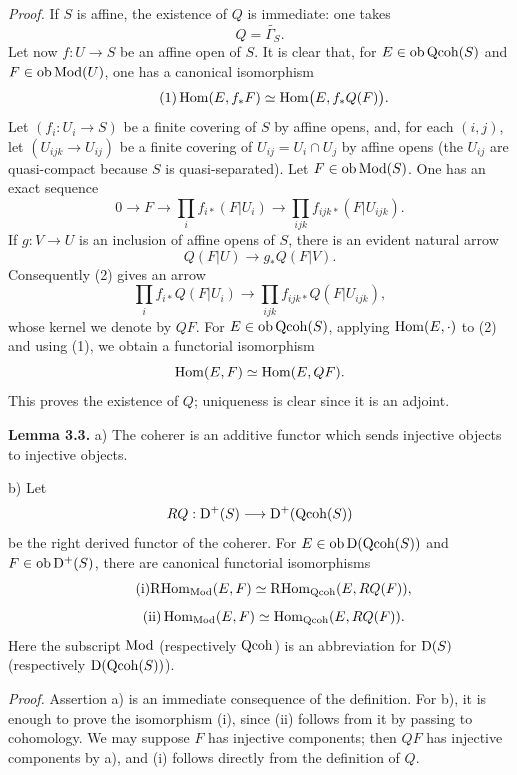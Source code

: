 \documentclass[11pt]{article}
\begin{document}
\emph{Proof.} If $S$ is affine, the existence of $Q$ is immediate: one takes
\[
Q=\widetilde{\Gamma_S}.
\]
Let now $f:U\to S$ be an affine open of $S$. It is clear that, for $E\in\operatorname{ob}\operatorname{Qcoh}(S)$ and $F\in\operatorname{ob}\operatorname{Mod}(U)$, one has a canonical isomorphism
\begin{equation}\tag{1}
\operatorname{Hom}(E,f_*F)\simeq \operatorname{Hom}\bigl(E,f_*Q(F)\bigr).
\end{equation}
Let $(f_i:U_i\to S)$ be a finite covering of $S$ by affine opens, and, for each $(i,j)$, let $(U_{ijk}\to U_{ij})$ be a finite covering of $U_{ij}=U_i\cap U_j$ by affine opens (the $U_{ij}$ are quasi-compact because $S$ is quasi-separated). Let $F\in\operatorname{ob}\operatorname{Mod}(S)$. One has an exact sequence
\begin{equation}\tag{2}
0\longrightarrow F\longrightarrow \prod_i f_{i*}(F|U_i)
\longrightarrow \prod_{ijk} f_{ijk*}(F|U_{ijk}).
\end{equation}
If $g:V\to U$ is an inclusion of affine opens of $S$, there is an evident natural arrow
\[
Q(F|U)\longrightarrow g_*Q(F|V).
\]
Consequently (2) gives an arrow
\begin{equation}\tag{3}
\prod_i f_{i*}Q(F|U_i)
\longrightarrow \prod_{ijk} f_{ijk*}Q(F|U_{ijk}),
\end{equation}
whose kernel we denote by $QF$. For $E\in\operatorname{ob}\operatorname{Qcoh}(S)$, applying $\operatorname{Hom}(E,\cdot)$ to (2) and using (1), we obtain a functorial isomorphism
\[
\operatorname{Hom}(E,F)\simeq \operatorname{Hom}(E,QF).
\]
This proves the existence of $Q$; uniqueness is clear since it is an adjoint.

\textbf{Lemma 3.3.} a) The coherer is an additive functor which sends injective objects to injective objects.

b) Let
\[
RQ:\mathrm D^+(S)\longrightarrow\mathrm D^+(\operatorname{Qcoh}(S))
\]
be the right derived functor of the coherer. For $E\in\operatorname{ob}\mathrm D(\operatorname{Qcoh}(S))$ and $F\in\operatorname{ob}\mathrm D^+(S)$, there are canonical functorial isomorphisms
\begin{equation}\tag{i}
\mathrm R\!\operatorname{Hom}_{\operatorname{Mod}}(E,F)\simeq \mathrm R\!\operatorname{Hom}_{\operatorname{Qcoh}}(E,RQ(F)),
\end{equation}
\begin{equation}\tag{ii}
\operatorname{Hom}_{\operatorname{Mod}}(E,F)\simeq \operatorname{Hom}_{\operatorname{Qcoh}}(E,RQ(F)).
\end{equation}
Here the subscript $\operatorname{Mod}$ (respectively $\operatorname{Qcoh}$) is an abbreviation for $\mathrm D(S)$ (respectively $\mathrm D(\operatorname{Qcoh}(S))$).

\emph{Proof.} Assertion a) is an immediate consequence of the definition. For b), it is enough to prove the isomorphism (i), since (ii) follows from it by passing to cohomology. We may suppose $F$ has injective components; then $QF$ has injective components by a), and (i) follows directly from the definition of $Q$.
\end{document}
